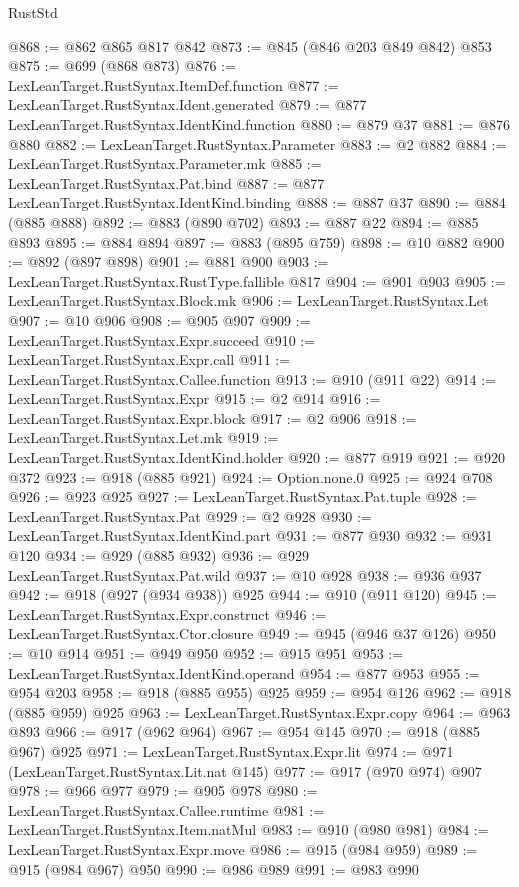 \begin{lexlean}{RustStd}
\begin{coremodule}
@868 := @862 @865 @817 @842
@873 := @845 (@846 @203 @849 @842) @853
@875 := @699 (@868 @873)
@876 := LexLeanTarget.RustSyntax.ItemDef.function
@877 := LexLeanTarget.RustSyntax.Ident.generated
@879 := @877 LexLeanTarget.RustSyntax.IdentKind.function
@880 := @879 @37
@881 := @876 @880
@882 := LexLeanTarget.RustSyntax.Parameter
@883 := @2 @882
@884 := LexLeanTarget.RustSyntax.Parameter.mk
@885 := LexLeanTarget.RustSyntax.Pat.bind
@887 := @877 LexLeanTarget.RustSyntax.IdentKind.binding
@888 := @887 @37
@890 := @884 (@885 @888)
@892 := @883 (@890 @702)
@893 := @887 @22
@894 := @885 @893
@895 := @884 @894
@897 := @883 (@895 @759)
@898 := @10 @882
@900 := @892 (@897 @898)
@901 := @881 @900
@903 := LexLeanTarget.RustSyntax.RustType.fallible @817
@904 := @901 @903
@905 := LexLeanTarget.RustSyntax.Block.mk
@906 := LexLeanTarget.RustSyntax.Let
@907 := @10 @906
@908 := @905 @907
@909 := LexLeanTarget.RustSyntax.Expr.succeed
@910 := LexLeanTarget.RustSyntax.Expr.call
@911 := LexLeanTarget.RustSyntax.Callee.function
@913 := @910 (@911 @22)
@914 := LexLeanTarget.RustSyntax.Expr
@915 := @2 @914
@916 := LexLeanTarget.RustSyntax.Expr.block
@917 := @2 @906
@918 := LexLeanTarget.RustSyntax.Let.mk
@919 := LexLeanTarget.RustSyntax.IdentKind.holder
@920 := @877 @919
@921 := @920 @372
@923 := @918 (@885 @921)
@924 := Option.none.{0}
@925 := @924 @708
@926 := @923 @925
@927 := LexLeanTarget.RustSyntax.Pat.tuple
@928 := LexLeanTarget.RustSyntax.Pat
@929 := @2 @928
@930 := LexLeanTarget.RustSyntax.IdentKind.part
@931 := @877 @930
@932 := @931 @120
@934 := @929 (@885 @932)
@936 := @929 LexLeanTarget.RustSyntax.Pat.wild
@937 := @10 @928
@938 := @936 @937
@942 := @918 (@927 (@934 @938)) @925
@944 := @910 (@911 @120)
@945 := LexLeanTarget.RustSyntax.Expr.construct
@946 := LexLeanTarget.RustSyntax.Ctor.closure
@949 := @945 (@946 @37 @126)
@950 := @10 @914
@951 := @949 @950
@952 := @915 @951
@953 := LexLeanTarget.RustSyntax.IdentKind.operand
@954 := @877 @953
@955 := @954 @203
@958 := @918 (@885 @955) @925
@959 := @954 @126
@962 := @918 (@885 @959) @925
@963 := LexLeanTarget.RustSyntax.Expr.copy
@964 := @963 @893
@966 := @917 (@962 @964)
@967 := @954 @145
@970 := @918 (@885 @967) @925
@971 := LexLeanTarget.RustSyntax.Expr.lit
@974 := @971 (LexLeanTarget.RustSyntax.Lit.nat @145)
@977 := @917 (@970 @974) @907
@978 := @966 @977
@979 := @905 @978
@980 := LexLeanTarget.RustSyntax.Callee.runtime
@981 := LexLeanTarget.RustSyntax.Item.natMul
@983 := @910 (@980 @981)
@984 := LexLeanTarget.RustSyntax.Expr.move
@986 := @915 (@984 @959)
@989 := @915 (@984 @967) @950
@990 := @986 @989
@991 := @983 @990

\end{coremodule}
\end{lexlean}
